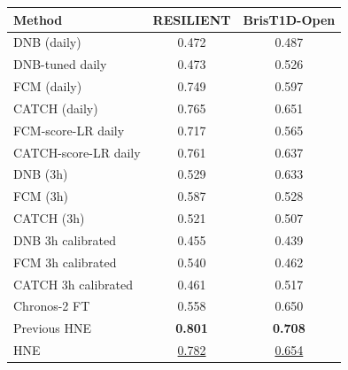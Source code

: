 \begin{tabular}{lcc}
\toprule
Method & RESILIENT & BrisT1D-Open \\
\midrule
DNB (daily) & 0.472 & 0.487 \\
DNB-tuned daily & 0.473 & 0.526 \\
FCM (daily) & 0.749 & 0.597 \\
CATCH (daily) & 0.765 & 0.651 \\
FCM-score-LR daily & 0.717 & 0.565 \\
CATCH-score-LR daily & 0.761 & 0.637 \\
DNB (3h) & 0.529 & 0.633 \\
FCM (3h) & 0.587 & 0.528 \\
CATCH (3h) & 0.521 & 0.507 \\
DNB 3h calibrated & 0.455 & 0.439 \\
FCM 3h calibrated & 0.540 & 0.462 \\
CATCH 3h calibrated & 0.461 & 0.517 \\
Chronos-2 FT & 0.558 & 0.650 \\
Previous HNE & \textbf{0.801} & \textbf{0.708} \\
HNE & \underline{0.782} & \underline{0.654} \\
\bottomrule
\end{tabular}